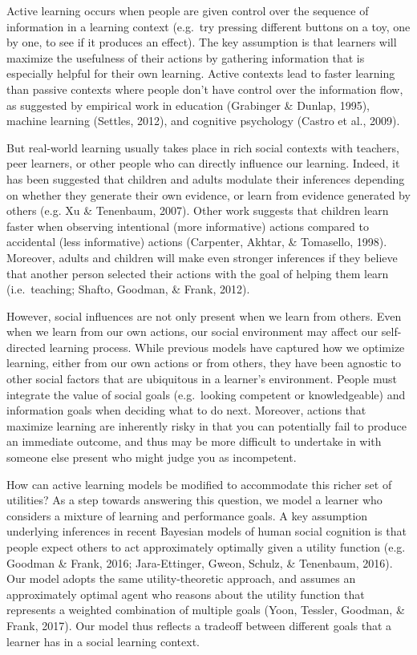 \documentclass[10pt, letterpaper]{article}
\begin{document}
Active learning occurs when people are given control over the sequence
of information in a learning context (e.g.~try pressing different
buttons on a toy, one by one, to see if it produces an effect). The key
assumption is that learners will maximize the usefulness of their
actions by gathering information that is especially helpful for their
own learning. Active contexts lead to faster learning than passive
contexts where people don't have control over the information flow, as
suggested by empirical work in education (Grabinger \& Dunlap, 1995),
machine learning (Settles, 2012), and cognitive psychology (Castro et
al., 2009).

But real-world learning usually takes place in rich social contexts with
teachers, peer learners, or other people who can directly influence our
learning. Indeed, it has been suggested that children and adults
modulate their inferences depending on whether they generate their own
evidence, or learn from evidence generated by others (e.g. Xu \&
Tenenbaum, 2007). Other work suggests that children learn faster when
observing intentional (more informative) actions compared to accidental
(less informative) actions (Carpenter, Akhtar, \& Tomasello, 1998).
Moreover, adults and children will make even stronger inferences if they
believe that another person selected their actions with the goal of
helping them learn (i.e.~teaching; Shafto, Goodman, \& Frank, 2012).

However, social influences are not only present when we learn from
others. Even when we learn from our own actions, our social environment
may affect our self-directed learning process. While previous models
have captured how we optimize learning, either from our own actions or
from others, they have been agnostic to other social factors that are
ubiquitous in a learner's environment. People must integrate the value
of social goals (e.g.~looking competent or knowledgeable) and
information goals when deciding what to do next. Moreover, actions that
maximize learning are inherently risky in that you can potentially fail
to produce an immediate outcome, and thus may be more difficult to
undertake in with someone else present who might judge you as
incompetent.

How can active learning models be modified to accommodate this richer
set of utilities? As a step towards answering this question, we model a
learner who considers a mixture of learning and performance goals. A key
assumption underlying inferences in recent Bayesian models of human
social cognition is that people expect others to act approximately
optimally given a utility function (e.g. Goodman \& Frank, 2016;
Jara-Ettinger, Gweon, Schulz, \& Tenenbaum, 2016). Our model adopts the
same utility-theoretic approach, and assumes an approximately optimal
agent who reasons about the utility function that represents a weighted
combination of multiple goals (Yoon, Tessler, Goodman, \& Frank, 2017).
Our model thus reflects a tradeoff between different goals that a
learner has in a social learning context.
\end{document}

